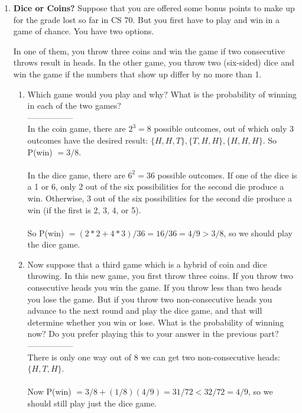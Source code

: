 \documentclass[11pt,fleqn]{article}
\begin{document}
\begin{enumerate}
\item \textbf{Dice or Coins?}
Suppose that you are offered some bonus points to make up for the grade lost so far in CS 70. But you first have to play and win in a game of chance. You have two options.

In one of them, you throw three coins and win the game if two consecutive throws result in heads. In the other game, you throw two (six-sided) dice and win the game if the numbers that show up differ by no more than 1.

\begin{enumerate}
\item Which game would you play and why? What is the probability of winning in each of the two games? \\
-----------------\\
In the coin game, there are $2^3=8$ possible outcomes, out of which only 3 outcomes  have the desired result: $\{H,H,T\},\{T,H,H\},\{H,H,H\}$. So P(win) $= 3/8$. \\\\
In the dice game, there are $6^2=36$ possible outcomes. If one of the dice is a 1 or 6, only 2 out of the six possibilities for the second die produce a win. Otherwise, 3 out of the six possibilities for the second die produce a win (if the first is 2, 3, 4, or 5). \\\\
So P(win) $= (2*2+4*3)/36 = 16/36 = 4/9 > 3/8$, so we should play the dice game.
\item Now suppose that a third game which is a hybrid of coin and dice throwing. In this new game, you first throw three coins. If you throw two consecutive heads you win the game. If you throw less than two heads you lose the game. But if you throw two non-consecutive heads you advance to the next round and play the dice game, and that will determine whether you win or lose.
What is the probability of winning now? Do you prefer playing this to your answer in the previous part? \\
-----------------\\
There is only one way out of 8 we can get two non-consecutive heads: $\{H,T,H\}$. \\\\
Now P(win) $= 3/8 + (1/8)(4/9) = 31/72 < 32/72 = 4/9$, so we should still play just the dice game.
\end{enumerate}


\end{enumerate}
\end{document}
